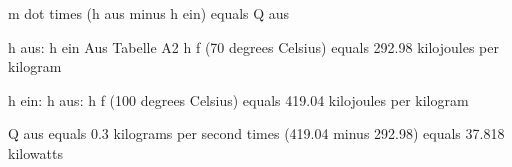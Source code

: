m dot times (h aus minus h ein) equals Q aus

h aus: h ein
Aus Tabelle A2
h f (70 degrees Celsius) equals 292.98 kilojoules per kilogram

h ein: h aus:
h f (100 degrees Celsius) equals 419.04 kilojoules per kilogram

Q aus equals 0.3 kilograms per second times (419.04 minus 292.98)
equals 37.818 kilowatts